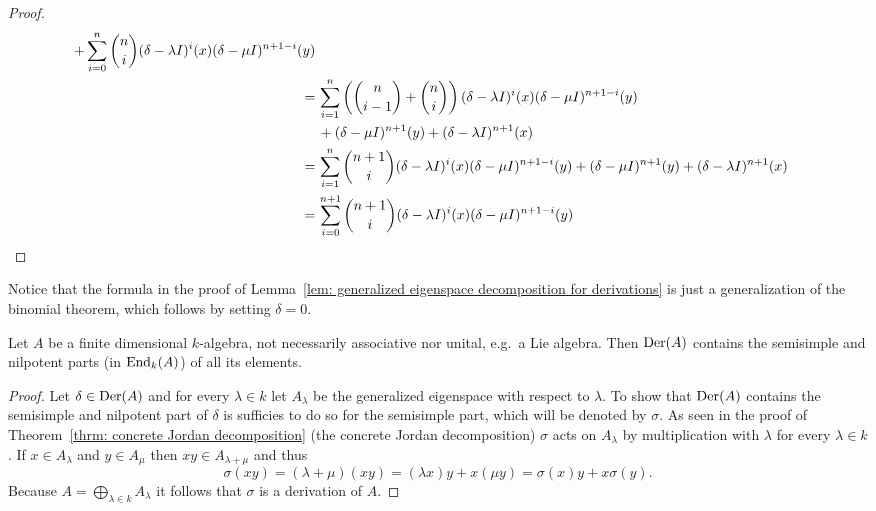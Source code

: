\begin{proof}
\begin{align*}
       +\sum_{i=0}^n \binom{n}{i} (\delta-\lambda I)^i(x) (\delta-\mu I)^{n+1-i}(y) \\
  =&\,  \sum_{i=1}^n \left(\binom{n}{i-1}+\binom{n}{i}\right) (\delta-\lambda I)^i(x) (\delta-\mu I)^{n+1-i}(y) \\
   &\, +(\delta-\mu I)^{n+1}(y) + (\delta-\lambda I)^{n+1}(x) \\
  =&\,  \sum_{i=1}^n \binom{n+1}{i} (\delta-\lambda I)^i(x) (\delta-\mu I)^{n+1-i}(y)
       +(\delta-\mu I)^{n+1}(y) + (\delta-\lambda I)^{n+1}(x) \\
  =&\, \sum_{i=0}^{n+1} \binom{n+1}{i} (\delta-\lambda I)^i(x) (\delta-\mu I)^{n+1-i}(y)
 \qedhere
 \end{align*}
 \endgroup
\end{proof}


\begin{rem}
 Notice that the formula in the proof of Lemma~\ref{lem: generalized eigenspace decomposition for derivations} is just a generalization of the binomial theorem, which follows by setting $\delta = 0$.
\end{rem}


\begin{lem}\label{lem: derivations contain the ss and np part of all its elements}
 Let $A$ be a finite dimensional $k$-algebra, not necessarily associative nor unital, e.g.\ a Lie algebra. Then $\operatorname{Der}(A)$ contains the semisimple and nilpotent parts (in $\operatorname{End}_k(A)$) of all its elements.
\end{lem}
\begin{proof}
 Let $\delta \in \operatorname{Der}(A)$ and for every $\lambda \in k$ let $A_\lambda$ be the generalized eigenspace with respect to $\lambda$. To show that $\operatorname{Der}(A)$ contains the semisimple and nilpotent part of $\delta$ is sufficies to do so for the semisimple part, which will be denoted by $\sigma$. As seen in the proof of Theorem~\ref{thrm: concrete Jordan decomposition} (the concrete Jordan decomposition) $\sigma$ acts on $A_\lambda$ by multiplication with $\lambda$ for every $\lambda \in k$. If $x \in A_\lambda$ and $y \in A_\mu$ then $xy \in A_{\lambda + \mu}$ and thus
 \[
  \sigma(xy)
  = (\lambda + \mu)(xy)
  = (\lambda x)y + x(\mu y)
  = \sigma(x)y + x\sigma(y).
 \]
 Because $A = \bigoplus_{\lambda \in k} A_\lambda$ it follows that $\sigma$ is a derivation of $A$.
\end{proof}


